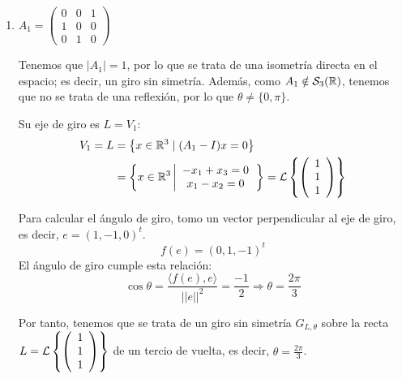 \begin{ejercicio}
    \begin{enumerate}
        \item $A_1=\left(\begin{array}{ccc}
            0 & 0 & 1 \\
            1 & 0 & 0 \\
            0 & 1 & 0
        \end{array}\right)$

        Tenemos que $|A_1|=1$, por lo que se trata de una isometría directa en el espacio; es decir, un giro sin simetría. Además, como $A_1\notin \mathcal{S}_3(\mathbb{R})$, tenemos que no se trata de una reflexión, por lo que $\theta\neq \{0,\pi\}$.

        Su eje de giro es $L=V_1$:
        \begin{equation*}
            \begin{split}
                V_1=L& = \left\{x\in \mathbb{R}^3 \mid (A_1-I)x=0\right\}\\
                & = \left\{x\in \mathbb{R}^3 \left|
                \begin{array}{c}
                    -x_1+x_3=0 \\
                    x_1-x_2=0
                \end{array}
                \right.\right\}
                = \mathcal{L}\left\{\left(\begin{array}{c}
                     1 \\ 1 \\ 1
                \end{array}\right)\right\}
            \end{split}
        \end{equation*}

        Para calcular el ángulo de giro, tomo un vector perpendicular al eje de giro, es decir, $e=(1,-1,0)^t$.
        \begin{equation*}
            f(e)=(0,1,-1)^t
        \end{equation*}
        El ángulo de giro cumple esta relación:
        \begin{equation*}
            \cos \theta = \frac{\langle f(e),e\rangle}{||e||^2} = \frac{-1}{2} \Longrightarrow \theta = \frac{2\pi}{3}
        \end{equation*}

        Por tanto, tenemos que se trata de un giro sin simetría $G_{L,\theta}$ sobre la recta $L=\mathcal{L}\left\{\left(\begin{array}{c}
                     1 \\ 1 \\ 1
                \end{array}\right)\right\}$ de un tercio de vuelta, es decir, $\theta=\frac{2\pi}{3}$.





\end{enumerate}
\end{ejercicio}
